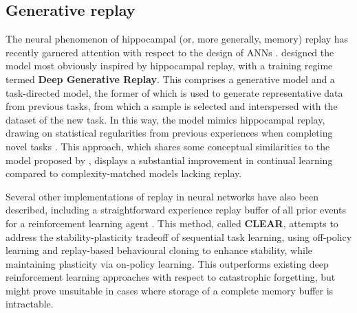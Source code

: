 \documentclass{article} %
\begin{document}
\subsection*{Generative replay}

The neural phenomenon of hippocampal (or, more generally, memory) replay has recently garnered attention with respect to the design of ANNs \citep{skaggs1996replay,shin2017continual,kemker2018measuring}. \citet{shin2017continual} designed the model most obviously inspired by hippocampal replay, with a training regime termed \textbf{Deep Generative Replay}. This comprises a generative model and a task-directed model, the former of which is used to generate representative data from previous tasks, from which a sample is selected and interspersed with the dataset of the new task. In this way, the model mimics hippocampal replay, drawing on statistical regularities from previous experiences when completing novel tasks \citep{liu2019human}. This approach, which shares some conceptual similarities to the model proposed by \citet{draelos2017neurogenesis}, displays a substantial improvement in continual learning compared to complexity-matched models lacking replay.

Several other implementations of replay in neural networks have also been described, including a straightforward experience replay buffer of all prior events for a reinforcement learning agent \citep{rolnick2018experience}. This method, called \textbf{CLEAR}, attempts to address the stability-plasticity tradeoff of sequential task learning, using off-policy learning and replay-based behavioural cloning to enhance stability, while maintaining plasticity via on-policy learning. This outperforms existing deep reinforcement learning approaches with respect to catastrophic forgetting, but might prove unsuitable in cases where storage of a complete memory buffer is intractable.
\end{document}
